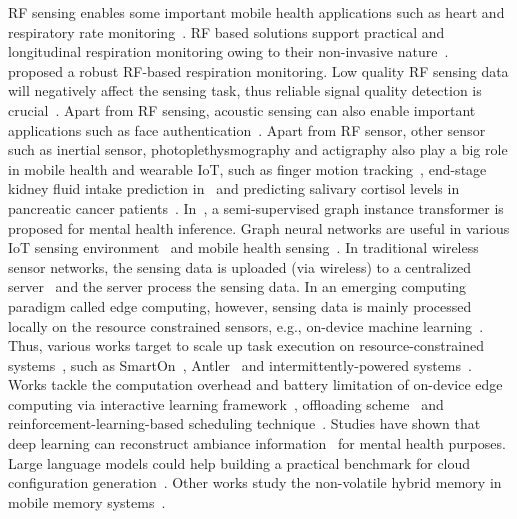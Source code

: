 RF sensing enables some important mobile health applications such as heart and respiratory rate monitoring~\cite{zongxing2022uwb,zongxing2022measure}. 
RF based solutions support practical and longitudinal respiration monitoring owing to their non-invasive nature~\cite{zongxing2023rf,zongxing2021uwb}.
~\cite{zongxing2024rfq} proposed a robust RF-based respiration monitoring.
Low quality RF sensing data will negatively affect the sensing task, thus reliable signal quality detection is crucial~\cite{zongxing2021quality}.
Apart from RF sensing, acoustic sensing can also enable important applications such as face authentication~\cite{zongxing2019face,zongxing2022face}.
Apart from RF sensor, other sensor such as inertial sensor, photoplethysmography and actigraphy also play a big role in mobile health and wearable IoT, 
such as finger motion tracking~\cite{yilin2021}, end-stage kidney fluid intake prediction in~\cite{guimin2022health} and predicting salivary cortisol levels in pancreatic cancer patients~\cite{guimin2021pancreatic}.
In~\cite{guimin2021health}, a semi-supervised graph instance transformer is proposed for mental health inference.
Graph neural networks are useful in various IoT sensing environment~\cite{guimin2023survey} and mobile health sensing~\cite{guimin_thesis}.
In traditional wireless sensor networks, the sensing data is uploaded (via wireless) to a centralized server~\cite{gupta2020,yubo2023blockchain} and the server process the sensing data.
In an emerging computing paradigm called edge computing, however, sensing data is mainly processed locally on the resource constrained sensors, 
e.g., on-device machine learning~\cite{yubo2020ondevice,yubo2022demo,yubo2019ondevice}.
Thus, various works target to scale up task execution on resource-constrained systems~\cite{yubo_thesis}, such as 
SmartOn~\cite{yubo2021smarton}, Antler~\cite{yubo2023efficient} and intermittently-powered systems~\cite{yubo2023audio,yubo2023intermittent}.
Works tackle the computation overhead and battery limitation of on-device edge computing via 
interactive learning framework~\cite{zhou2022}, offloading scheme~\cite{zhou2023offloading} and reinforcement-learning-based scheduling technique~\cite{zhou2023}.
Studies have shown that deep learning can reconstruct ambiance information~\cite{wenwan} for mental health purposes.
Large language models could help building a practical benchmark for cloud configuration generation~\cite{yuning2023cloud}.
Other works study the non-volatile hybrid memory in mobile memory systems~\cite{feiwen2021,feiwen2021fpga,feiwen2022}.

